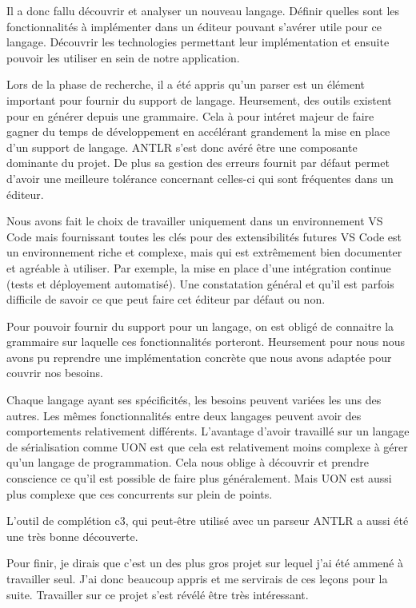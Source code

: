 \documentclass[
    iict, %
    il, %
]{heig-tb}
\begin{document}
Il a donc fallu découvrir et analyser un nouveau langage.
Définir quelles sont les fonctionnalités à implémenter dans un éditeur pouvant s'avérer utile pour ce langage.
Découvrir les technologies permettant leur implémentation et ensuite pouvoir les utiliser en sein de notre application.

Lors de la phase de recherche, il a été appris qu'un parser est un élément important pour fournir du support de langage.
Heursement, des outils existent pour en générer depuis une grammaire. Cela à pour intéret majeur de faire gagner du temps de développement en accélérant grandement la mise en place d'un support de langage.
ANTLR s'est donc avéré être une composante dominante du projet. De plus sa gestion des erreurs fournit par défaut permet d'avoir une meilleure tolérance concernant celles-ci
qui sont fréquentes dans un éditeur.

Nous avons fait le choix de travailler uniquement dans un environnement VS Code mais fournissant toutes les clés pour des extensibilités futures
VS Code est un environnement riche et complexe, mais qui est extrêmement bien documenter et agréable à utiliser.
Par exemple, la mise en place d'une intégration continue (tests et déployement automatisé).
Une constatation général et qu'il est parfois difficile de savoir ce que peut faire cet éditeur par défaut ou non.

Pour pouvoir fournir du support pour un langage, on est obligé de connaitre la grammaire sur laquelle ces fonctionnalités porteront.
Heursement pour nous nous avons pu reprendre une implémentation concrète que nous avons adaptée pour couvrir nos besoins.

Chaque langage ayant ses spécificités, les besoins peuvent variées les uns des autres.
Les mêmes fonctionnalités entre deux langages peuvent avoir des comportements relativement différents.
L'avantage d'avoir travaillé sur un langage de sérialisation comme UON est que cela est relativement moins complexe à gérer qu'un langage de programmation.
Cela nous oblige à découvrir et prendre conscience ce qu'il est possible de faire plus généralement.
Mais UON est aussi plus complexe que ces concurrents sur plein de points.

L'outil de complétion c3, qui peut-être utilisé avec un parseur ANTLR a aussi été une très bonne découverte.

Pour finir, je dirais que c'est un des plus gros projet sur lequel j'ai été ammené à travailler seul.
J'ai donc beaucoup appris et me servirais de ces leçons pour la suite. Travailler sur ce projet s'est révélé être très intéressant.
\end{document}
